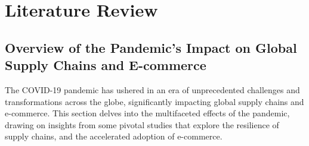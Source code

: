 \chapter{Literature Review}
\label{chap:literature}

\section{Overview of the Pandemic's Impact on Global Supply Chains and E-commerce}

The COVID-19 pandemic has ushered in an era of unprecedented challenges and transformations across the globe, significantly impacting global supply chains and e-commerce. This section delves into the multifaceted effects of the pandemic, drawing on insights from some pivotal studies that explore the resilience of supply chains, and the accelerated adoption of e-commerce.

